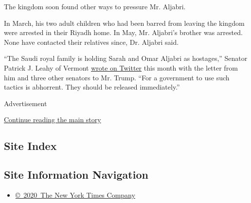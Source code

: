 The kingdom soon found other ways to pressure Mr. Aljabri.

In March, his two adult children who had been barred from leaving the
kingdom were arrested in their Riyadh home. In May, Mr. Aljabri's
brother was arrested. None have contacted their relatives since, Dr.
Aljabri said.

``The Saudi royal family is holding Sarah and Omar Aljabri as
hostages,'' Senator Patrick J. Leahy of Vermont
\href{https://twitter.com/SenatorLeahy/status/1281281725499408386}{wrote
on Twitter} this month with the letter from him and three other senators
to Mr. Trump. ``For a government to use such tactics is abhorrent. They
should be released immediately.''

Advertisement

\protect\hyperlink{after-bottom}{Continue reading the main story}

\hypertarget{site-index}{%
\subsection{Site Index}\label{site-index}}

\hypertarget{site-information-navigation}{%
\subsection{Site Information
Navigation}\label{site-information-navigation}}

\begin{itemize}
\tightlist
\item
  \href{https://help.nytimes3xbfgragh.onion/hc/en-us/articles/115014792127-Copyright-notice}{©~2020~The
  New York Times Company}
\end{itemize}

